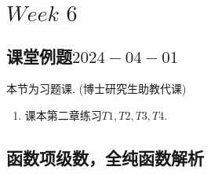 \ifx\allfiles\undefined


	\else
	\fi

\chapter{$Week \,\, 6$}
\section{课堂例题$2024-04-01$}
\begin{center}
	本节为习题课. (博士研究生助教代课)
\end{center}
\begin{enumerate}
	\item 课本第二章练习$T1 , T2 , T3 , T4$.
\end{enumerate}

\newpage

\section{函数项级数，全纯函数解析}

